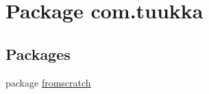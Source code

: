 \hypertarget{namespacecom_1_1tuukka}{\section{Package com.\-tuukka}
\label{namespacecom_1_1tuukka}
}
\subsection*{Packages}
\begin{DoxyCompactItemize}
\item 
package \hyperlink{namespacecom_1_1tuukka_1_1fromscratch}{fromscratch}
\end{DoxyCompactItemize}
